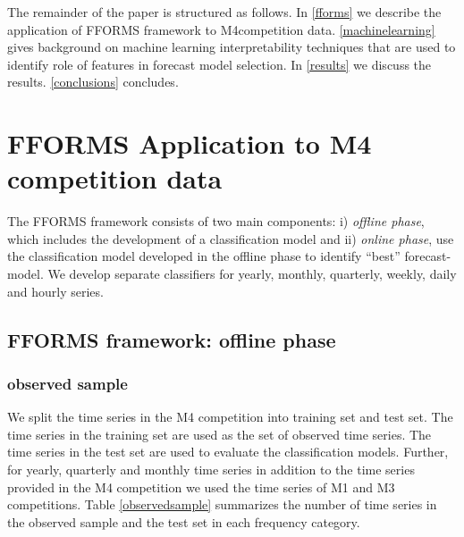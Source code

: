 \documentclass[11pt,a4paper,]{article}
\begin{document}
The remainder of the paper is structured as follows. In \autoref{fforms}
we describe the application of FFORMS framework to M4competition data.
\autoref{machinelearning} gives background on machine learning
interpretability techniques that are used to identify role of features
in forecast model selection. In \autoref{results} we discuss the
results. \autoref{conclusions} concludes.

\section{FFORMS Application to M4 competition data}\label{fforms}

The FFORMS framework consists of two main components: i) \emph{offline
phase}, which includes the development of a classification model and ii)
\emph{online phase}, use the classification model developed in the
offline phase to identify ``best'' forecast-model. We develop separate
classifiers for yearly, monthly, quarterly, weekly, daily and hourly
series.

\subsection{FFORMS framework: offline
phase}\label{fforms-framework-offline-phase}

\subsubsection{observed sample}\label{observed-sample}

We split the time series in the M4 competition into training set and
test set. The time series in the training set are used as the set of
observed time series. The time series in the test set are used to
evaluate the classification models. Further, for yearly, quarterly and
monthly time series in addition to the time series provided in the M4
competition we used the time series of M1 and M3 competitions. Table
\ref{observedsample} summarizes the number of time series in the
observed sample and the test set in each frequency category.
\end{document}
